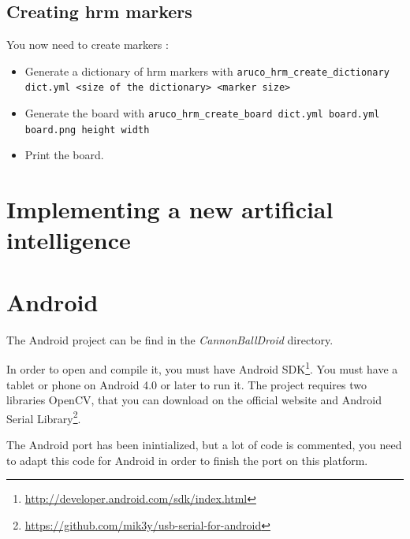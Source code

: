 \documentclass[a4paper,11pt]{report}
\begin{document}
\subsection{Creating hrm markers}
\label{subsec:dic}

You now need to create markers : \begin{itemize}

    \item Generate a dictionary of hrm markers with
        \texttt{aruco\_hrm\_create\_dictionary dict.yml <size of the
        dictionary> <marker size>}

    \item Generate the board with \texttt{aruco\_hrm\_create\_board dict.yml
        board.yml board.png height width}

    \item Print the board.

\end{itemize}

\section{Implementing a new artificial intelligence}

\section{Android}

The Android project can be find in the \emph{CannonBallDroid} directory.

In order to open and compile it, you must have Android
SDK\footnote{\url{http://developer.android.com/sdk/index.html}}.
You must have a tablet or phone on Android 4.0 or later to run it.
The project requires two libraries OpenCV, that you can download on the
official website and Android Serial
Library\footnote{\url{https://github.com/mik3y/usb-serial-for-android}}.

The Android port has been inintialized, but a lot of code is commented, you
need to adapt this code for Android in order to finish the port on this
platform.
\end{document}
